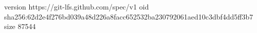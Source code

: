 version https://git-lfs.github.com/spec/v1
oid sha256:62d2e4f276bd039a48d226a8facc652532ba230792061aed10c3dbf4dd5ff3b7
size 87544
